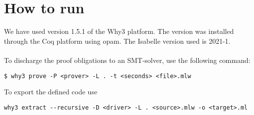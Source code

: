 \section{How to run}
We have used version 1.5.1 of the Why3 platform. The version was installed through the Coq platform using opam.
The Isabelle version used is 2021-1.
\\~\\
To discharge the proof obligations to an SMT-solver, use the following command:

\begin{lstlisting}
$ why3 prove -P <prover> -L . -t <seconds> <file>.mlw
\end{lstlisting}

To export the defined code use

\begin{lstlisting}
why3 extract --recursive -D <driver> -L . <source>.mlw -o <target>.ml
\end{lstlisting}